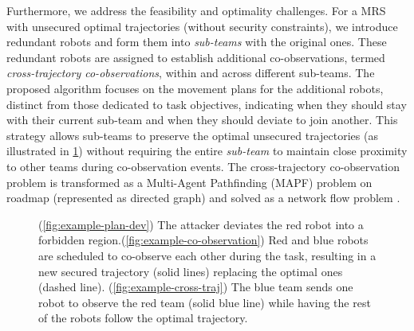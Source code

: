 \documentclass[10pt,twocolumn,twoside]{IEEEtran}
\begin{document}
Furthermore, we address the feasibility and optimality challenges. For a MRS with unsecured optimal trajectories (without security constraints), we introduce redundant robots and form them into \emph{sub-teams} with the original ones. These redundant robots are assigned to establish additional co-observations, termed \emph{cross-trajectory co-observations}, within and across different sub-teams. The proposed algorithm focuses on the movement plans for the additional robots, distinct from those dedicated to task objectives, indicating when they should stay with their current sub-team and when they should deviate to join another. This strategy allows sub-teams to preserve the optimal unsecured trajectories (as illustrated in \cref{fig:cross-traj-comparison-set}) without requiring the entire \emph{sub-team} to maintain close proximity to other teams during co-observation events. The cross-trajectory co-observation problem is transformed as a Multi-Agent Pathfinding (MAPF) problem on roadmap (represented as directed graph) and solved as a network flow problem \cite{yu2013multi}.

\begin{figure}
	\centering
    
    \caption{ (\ref{fig:example-plan-dev}) The attacker deviates the red robot into a forbidden region.(\ref{fig:example-co-observation}) Red and blue robots are scheduled to co-observe each other during the task, resulting in a new secured trajectory (solid lines) replacing the optimal ones (dashed line). (\ref{fig:example-cross-traj}) The blue team sends one robot to observe the red team (solid blue line) while having the rest of the robots follow the optimal trajectory.}\label{fig:cross-traj-comparison-set}
\end{figure}
\end{document}
